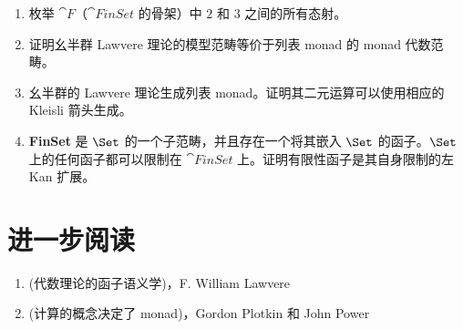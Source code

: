 \begin{enumerate}
  \tightlist
  \item
        枚举 $\cat{F}$（$\cat{FinSet}$ 的骨架）中 $2$ 和 $3$ 之间的所有态射。
  \item
        证明幺半群 Lawvere 理论的模型范畴等价于列表 monad 的 monad 代数范畴。
  \item
        幺半群的 Lawvere 理论生成列表 monad。证明其二元运算可以使用相应的 Kleisli 箭头生成。
  \item
        \textbf{FinSet} 是 $\Set$ 的一个子范畴，并且存在一个将其嵌入 $\Set$ 的函子。$\Set$ 上的任何函子都可以限制在 $\cat{FinSet}$ 上。证明有限性函子是其自身限制的左 Kan 扩展。
\end{enumerate}

\section{进一步阅读}
\begin{enumerate}
  \tightlist
  \item
         (代数理论的函子语义学)，F. William Lawvere
  \item
         (计算的概念决定了 monad)，Gordon Plotkin 和 John Power
\end{enumerate}
